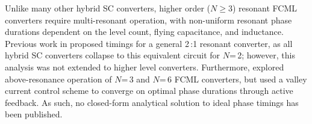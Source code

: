 







Unlike many other hybrid SC converters, higher order ($N\geq3$) resonant FCML converters require multi-resonant operation, with non-uniform resonant phase durations dependent on the level count, flying capacitance, and inductance.
Previous work in \cite{Kesarwani_COMPEL2015,Rentmeister_COMPEL2018} proposed timings for a general 2\,:1 resonant converter, as all hybrid SC converters collapse to this equivalent circuit for $N$=\,2; however, this analysis was not extended to higher level converters.
Furthermore, \cite{Schaef_TPEL2018} explored above-resonance operation of $N$=\,3 and $N$=\,6 FCML converters, but used a valley current control scheme to converge on optimal phase durations through active feedback.
As such, no closed-form analytical solution to ideal phase timings has been published. 

